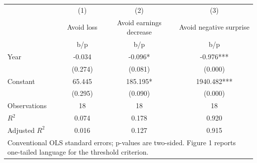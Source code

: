 {
\def\sym#1{\ifmmode^{#1}\else\(^{#1}\)\fi}
\begin{tabular}{l*{3}{c}}
\hline\hline
                    &\multicolumn{1}{c}{(1)}&\multicolumn{1}{c}{(2)}&\multicolumn{1}{c}{(3)}\\
                    &\multicolumn{1}{c}{Avoid loss}&\multicolumn{1}{c}{Avoid earnings decrease}&\multicolumn{1}{c}{Avoid negative surprise}\\
                    &         b/p   &         b/p   &         b/p   \\
\hline
Year                &      -0.034   &      -0.096*  &      -0.976***\\
                    &     (0.274)   &     (0.081)   &     (0.000)   \\
Constant            &      65.445   &     185.195*  &    1940.482***\\
                    &     (0.295)   &     (0.090)   &     (0.000)   \\
\hline
Observations        &          18   &          18   &          18   \\
\(R^{2}\)           &       0.074   &       0.178   &       0.920   \\
Adjusted \(R^{2}\)  &       0.016   &       0.127   &       0.915   \\
\hline\hline
\multicolumn{4}{l}{\footnotesize Conventional OLS standard errors; p-values are two-sided. Figure 1 reports one-tailed language for the threshold criterion.}\\
\end{tabular}
}
